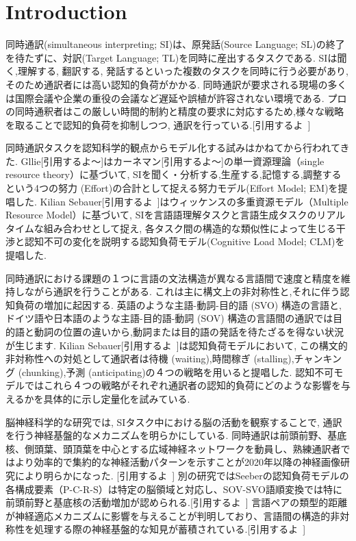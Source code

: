 \section{Introduction}

同時通訳(simultaneous interpreting; SI)は、原発話(Source Language; SL)の終了を待たずに、対訳(Target Language; TL)を同時に産出するタスクである.
SIは聞く,理解する, 翻訳する, 発話するといった複数のタスクを同時に行う必要があり, そのため通訳者には高い認知的負荷がかかる. 
同時通訳が要求される現場の多くは国際会議や企業の重役の会議など遅延や誤植が許容されない環境である.
プロの同時通釈者はこの厳しい時間的制約と精度の要求に対応するため,様々な戦略を取ることで認知的負荷を抑制しつつ, 通訳を行っている.[引用するよ~]

同時通訳タスクを認知科学的観点からモデル化する試みはかねてから行われてきた.
Gllie[引用するよ〜]はカーネマン[引用するよ〜]の単一資源理論（single resource theory）に基づいて, SIを聞く・分析する,生産する,記憶する,調整するという4つの努力 (Effort)の合計として捉える努力モデル(Effort Model; EM)を提唱した.
Kilian Sebauer[引用するよ~]はウィッケンスの多重資源モデル（Multiple Resource Model）に基づいて, SIを言語語理解タスクと言語生成タスクのリアルタイムな組み合わせとして捉え, 各タスク間の構造的な類似性によって生じる干渉と認知不可の変化を説明する認知負荷モデル(Cognitive Load Model; CLM)を提唱した.

同時通訳における課題の１つに言語の文法構造が異なる言語間で速度と精度を維持しながら通訳を行うことがある.
これは主に構文上の非対称性と,それに伴う認知負荷の増加に起因する.
英語のような主語-動詞-目的語 (SVO) 構造の言語と, ドイツ語や日本語のような主語-目的語-動詞 (SOV) 構造の言語間の通訳では目的語と動詞の位置の違いから,動詞または目的語の発話を待たざるを得ない状況が生じます.
Kilian Sebauer[引用するよ~]は認知負荷モデルにおいて, この構文的非対称性への対処として通訳者は待機 (waiting),時間稼ぎ (stalling),チャンキング (chunking),予測 (anticipating)の４つの戦略を用いると提唱した.
認知不可モデルではこれら４つの戦略がそれぞれ通訳者の認知的負荷にどのような影響を与えるかを具体的に示し定量化を試みている.

脳神経科学的な研究では, SIタスク中における脳の活動を観察することで, 通訳を行う神経基盤的なメカニズムを明らかにしている.
同時通訳は前頭前野、基底核、側頭葉、頭頂葉を中心とする広域神経ネットワークを動員し、熟練通訳者ではより効率的で集約的な神経活動パターンを示すことが2020年以降の神経画像研究により明らかになった. [引用するよ~]
別の研究ではSeeberの認知負荷モデルの各構成要素（P-C-R-S）は特定の脳領域と対応し、SOV-SVO語順変換では特に前頭前野と基底核の活動増加が認められる.[引用するよ~]
言語ペアの類型的距離が神経適応メカニズムに影響を与えることが判明しており、言語間の構造的非対称性を処理する際の神経基盤的な知見が蓄積されている.[引用するよ~]

